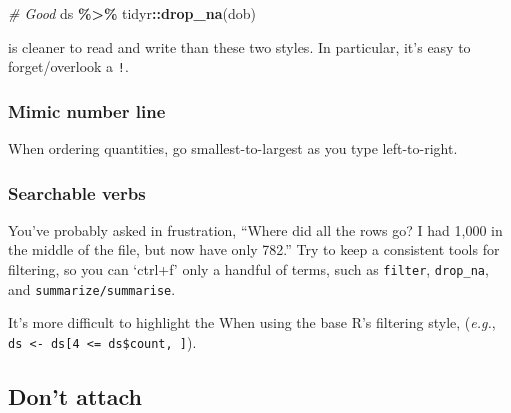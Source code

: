 \documentclass[
]{book}
\newenvironment{Shaded}{\begin{snugshade}}{\end{snugshade}}
\newcommand{\CommentTok}[1]{\textcolor[rgb]{0.56,0.35,0.01}{\textit{#1}}}
\newcommand{\KeywordTok}[1]{\textcolor[rgb]{0.13,0.29,0.53}{\textbf{#1}}}
\newcommand{\NormalTok}[1]{#1}
\newcommand{\OperatorTok}[1]{\textcolor[rgb]{0.81,0.36,0.00}{\textbf{#1}}}
\newcommand{\StringTok}[1]{\textcolor[rgb]{0.31,0.60,0.02}{#1}}
\begin{document}
\begin{Shaded}
\begin{Highlighting}[]
\CommentTok{\# Good}
\NormalTok{ds }\OperatorTok{\%>\%}
\StringTok{  }\NormalTok{tidyr}\OperatorTok{::}\KeywordTok{drop\_na}\NormalTok{(dob)}
\end{Highlighting}
\end{Shaded}

is cleaner to read and write than these two styles. In particular, it's easy to forget/overlook a \texttt{!}.

\begin{Shaded}
\end{Shaded}

\hypertarget{style-filter-number-line}{%
\subsubsection{Mimic number line}\label{style-filter-number-line}}

When ordering quantities, go smallest-to-largest as you type left-to-right.

\hypertarget{style-filter-searchable}{%
\subsubsection{Searchable verbs}\label{style-filter-searchable}}

You've probably asked in frustration, ``Where did all the rows go? I had 1,000 in the middle of the file, but now have only 782.'' Try to keep a consistent tools for filtering, so you can `ctrl+f' only a handful of terms, such as
\texttt{filter},
\texttt{drop\_na}, and
\texttt{summarize/summarise}.

It's more difficult to highlight the When using the base R's filtering style, (\emph{e.g.}, \texttt{ds\ \textless{}-\ ds{[}4\ \textless{}=\ ds\$count,\ {]}}).

\hypertarget{style-attach}{%
\subsection{Don't attach}\label{style-attach}}
\end{document}
